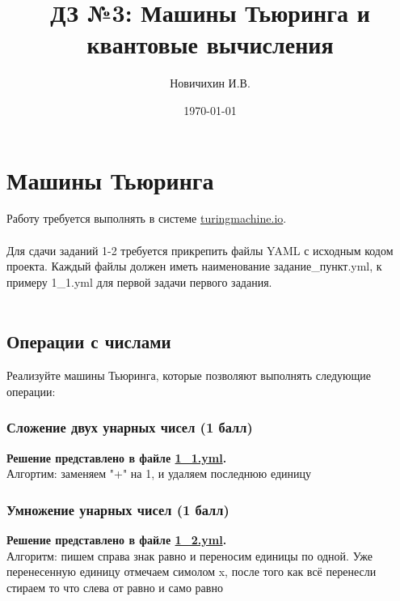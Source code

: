 \documentclass[a4paper,12pt]{article}
\author{Новичихин И.В.}
\title{ДЗ №3: Машины Тьюринга и квантовые вычисления}
\date{\today}
\begin{document}
\maketitle
\newpage






\section{Машины Тьюринга}

Работу требуется выполнять в системе \url{turingmachine.io}. \\\\
Для сдачи заданий 1-2 требуется прикрепить файлы YAML с исходным кодом проекта. Каждый файлы должен иметь наименование задание\_пункт.yml, к примеру 1\_1.yml для первой задачи первого задания. \\\\


\subsection{Операции с числами}

Реализуйте машины Тьюринга, которые позволяют выполнять следующие операции:

\subsubsection{Сложение двух унарных чисел (1 балл)}

\textbf{Решение представлено в файле \href{https://github.com/NRU-MPEI-IMAI/tm-and-qc-NovichikhinIV/blob/main/yml/1_1.yml}{1\_1.yml}.} \\

Алгортим: заменяем "+" на 1, и удаляем последнюю единицу


\subsubsection{Умножение унарных чисел (1 балл)}

\textbf{Решение представлено в файле \href{https://github.com/NRU-MPEI-IMAI/tm-and-qc-NovichikhinIV/blob/main/yml/1_2.yml}{1\_2.yml}.} \\

Алгоритм: пишем справа знак равно и переносим единицы по одной. Уже перенесенную единицу отмечаем симолом x, после того как всё перенесли стираем то что слева от равно и само равно \\\\
\end{document}
